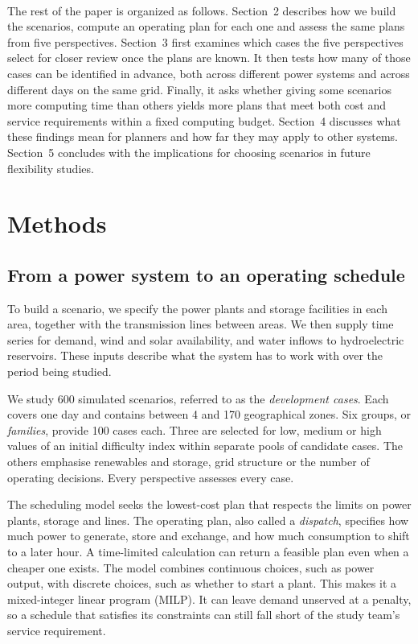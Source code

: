 \documentclass[11pt,a4paper]{article}
\begin{document}
\paragraph{}
The rest of the paper is organized as follows. Section~2 describes how we build the scenarios, compute an operating plan for each one and assess the same plans from five perspectives. Section~3 first examines which cases the five perspectives select for closer review once the plans are known. It then tests how many of those cases can be identified in advance, both across different power systems and across different days on the same grid. Finally, it asks whether giving some scenarios more computing time than others yields more plans that meet both cost and service requirements within a fixed computing budget. Section~4 discusses what these findings mean for planners and how far they may apply to other systems. Section~5 concludes with the implications for choosing scenarios in future flexibility studies.

\section{Methods}
\subsection{From a power system to an operating schedule}
\label{sec:scenario}

To build a scenario, we specify the power plants and storage facilities in each area, together with the transmission lines between areas. We then supply time series for demand, wind and solar availability, and water inflows to hydroelectric reservoirs. These inputs describe what the system has to work with over the period being studied.

We study 600 simulated scenarios, referred to as the \emph{development cases}. Each covers one day and contains between 4 and 170 geographical zones. Six groups, or \emph{families}, provide 100 cases each. Three are selected for low, medium or high values of an initial difficulty index within separate pools of candidate cases. The others emphasise renewables and storage, grid structure or the number of operating decisions. Every perspective assesses every case.

The scheduling model seeks the lowest-cost plan that respects the limits on power plants, storage and lines. The operating plan, also called a \emph{dispatch}, specifies how much power to generate, store and exchange, and how much consumption to shift to a later hour. A time-limited calculation can return a feasible plan even when a cheaper one exists. The model combines continuous choices, such as power output, with discrete choices, such as whether to start a plant. This makes it a mixed-integer linear program (MILP). It can leave demand unserved at a penalty, so a schedule that satisfies its constraints can still fall short of the study team's service requirement.
\end{document}
